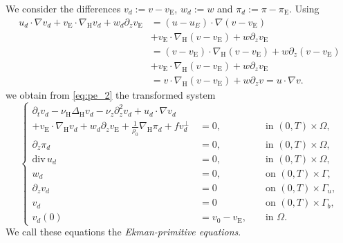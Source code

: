 \documentclass[preprint]{elsarticle}
\numberwithin{equation}{section}
\newcommand {\T}	{\mathbb{T}}
\renewcommand{\d}{\, \mathrm{d}}
\renewcommand{\H}{\mathrm{H}}
\newcommand{\dk}[1]{\partial_{#1}}
\newcommand{\dz}{\dk{z}}
\renewcommand{\bar}[1]{\overline{#1}}
\newcommand{\vbar}{\bar{v}}
\newcommand{\vtilde}{\tilde{v}}
\newcommand{\nablaH}{\nabla_{\H}}
\newcommand{\DeltaH}{\Delta_{\H}}
\newcommand{\rH}{\H}
\newcommand{\rE}{\mathrm{E}}
\renewcommand{\div}{\mathrm{div} \,}
\begin{document}
We consider the differences $v_d := v - v_{\rE}$, $w_d := w$ and $\pi_d := \pi - \pi_{\rE}$. Using
\begin{align*}
	u_d \cdot \nabla v_d 
	+ v_{\rE} \cdot \nablaH v_d 
	+ w_d \partial_z v_{\rE} 
	&= (u-u_E) \cdot \nabla (v-v_{\rE}) 
	\\
	&+ v_{\rE} \cdot \nablaH (v-v_{\rE}) 
	+ w \partial_z v_{\rE} \\
	&= (v-v_{\rE}) \cdot \nablaH (v-v_{\rE})
	+ w \partial_z (v-v_{\rE}) \\
	&+ v_{\rE} \cdot \nablaH (v-v_{\rE}) 
	+ w \partial_z v_{\rE} \\
	&= v \cdot \nablaH (v-v_{\rE})
	+ w \partial_z v 
	= u \cdot \nabla v .
\end{align*}
we obtain from
\eqref{eq:pe_2}
the transformed system
\begin{equation}
	\left\{
	\begin{aligned}
		\partial_t v_d - \nu_{\rH} \DeltaH v_d - \nu_z \partial_z^2 v_d + u_d \cdot \nabla v_d \phantom{aaa} & && \\
		+ v_{\rE} \cdot \nablaH v_d 
		+ w_d \dz v_{\rE} + \frac{1}{\rho_0}\nablaH \pi_d + f v_d^\perp &= 0,
		&&\text{ in } (0,T) \times \Omega, \\
		\partial_z \pi_d &= 0, &&\text{ in } (0,T) \times \Omega, \\
		\div u_d &= 0, &&\text{ in } (0,T) \times \Omega, \\
		w_d &= 0, &&\text{ on } (0,T) \times \Gamma, \\
		\partial_z v_d &= 0 &&\text{ on } (0,T) \times \Gamma_u,\\
		v_d &= 0 &&\text{ on } (0,T) \times \Gamma_b, \\
		v_d(0) &= v_0-v_{\rE}, &&\text{ in } \Omega.
	\end{aligned}
	\right. 
	\label{eq:difference_2}
\end{equation}
We call these equations the \emph{Ekman-primitive equations}.
\end{document}
